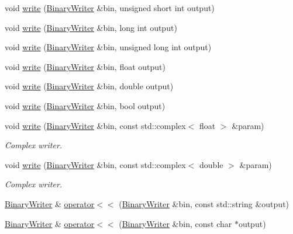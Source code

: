 \begin{DoxyCompactItemize}
\item 
void \mbox{\hyperlink{namespaceADATIO_aed0610520a88cb6c8ba3cfd5b9ea2a8f}{write}} (\mbox{\hyperlink{classADATIO_1_1BinaryWriter}{Binary\+Writer}} \&bin, unsigned short int output)
\item 
void \mbox{\hyperlink{namespaceADATIO_a163945e3b7a7ffeb94176c87d14dd21d}{write}} (\mbox{\hyperlink{classADATIO_1_1BinaryWriter}{Binary\+Writer}} \&bin, long int output)
\item 
void \mbox{\hyperlink{namespaceADATIO_a68445b40d5732188a488e7b95b3cc6cc}{write}} (\mbox{\hyperlink{classADATIO_1_1BinaryWriter}{Binary\+Writer}} \&bin, unsigned long int output)
\item 
void \mbox{\hyperlink{namespaceADATIO_a0bd8eac36791c194c12fd2005d87046d}{write}} (\mbox{\hyperlink{classADATIO_1_1BinaryWriter}{Binary\+Writer}} \&bin, float output)
\item 
void \mbox{\hyperlink{namespaceADATIO_adc3666e3bf7803200f6dbd4eb96463fb}{write}} (\mbox{\hyperlink{classADATIO_1_1BinaryWriter}{Binary\+Writer}} \&bin, double output)
\item 
void \mbox{\hyperlink{namespaceADATIO_a936b2163d1c60aa98f39841bed52f62a}{write}} (\mbox{\hyperlink{classADATIO_1_1BinaryWriter}{Binary\+Writer}} \&bin, bool output)
\item 
void \mbox{\hyperlink{namespaceADATIO_a653bde19d92b24f8269adfa361bdabda}{write}} (\mbox{\hyperlink{classADATIO_1_1BinaryWriter}{Binary\+Writer}} \&bin, const std\+::complex$<$ float $>$ \&param)
\begin{DoxyCompactList}\small\item\em Complex writer. \end{DoxyCompactList}\item 
void \mbox{\hyperlink{namespaceADATIO_a4d080cdbb3d8b34b2e8cf03001f8b7f0}{write}} (\mbox{\hyperlink{classADATIO_1_1BinaryWriter}{Binary\+Writer}} \&bin, const std\+::complex$<$ double $>$ \&param)
\begin{DoxyCompactList}\small\item\em Complex writer. \end{DoxyCompactList}\item 
\mbox{\hyperlink{classADATIO_1_1BinaryWriter}{Binary\+Writer}} \& \mbox{\hyperlink{namespaceADATIO_a10c403177088d104f13bd52cefae2a84}{operator$<$$<$}} (\mbox{\hyperlink{classADATIO_1_1BinaryWriter}{Binary\+Writer}} \&bin, const std\+::string \&output)
\item 
\mbox{\hyperlink{classADATIO_1_1BinaryWriter}{Binary\+Writer}} \& \mbox{\hyperlink{namespaceADATIO_aa30c54a0a5271fc122506186fdf276c0}{operator$<$$<$}} (\mbox{\hyperlink{classADATIO_1_1BinaryWriter}{Binary\+Writer}} \&bin, const char $\ast$output)

\end{DoxyCompactItemize}
